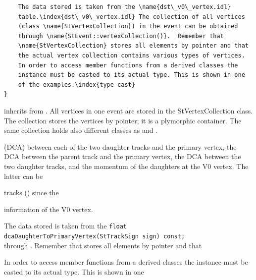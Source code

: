 \begin{enumerate}
\begin{Entry}
\begin{Entry}
{\begin{verbatim}
    The data stored is taken from the \name{dst\_v0\_vertex.idl}
    table.\index{dst\_v0\_vertex.idl} The collection of all vertices
    (class \name{StVertexCollection}) in the event can be obtained
    through \name{StEvent::vertexCollection()}.  Remember that
    \name{StVertexCollection} stores all elements by pointer and that
    the actual vertex collection contains various types of vertices.
    In order to access member functions from a derived classes the
    instance must be casted to its actual type. This is shown in one
    of the examples.\index{type cast}
}
\end{verbatim}
}%
%
     inherits from  .
    All vertices in one event are stored
    in the StVertexCollection class. The collection stores the
    vertices by pointer; it is a plymorphic container.
    The same collection holds also different classes as  and .
   
    (DCA) between each of the two daughter tracks and the
    primary vertex, the DCA between the parent track and the primary vertex,
    the DCA between the two daughter tracks, and the
    momentum of the daughters at the V0 vertex. The latter can be
    
    tracks () since the
    
    information of the V0 vertex.

    The data stored is taken from the 
    \verb+float dcaDaughterToPrimaryVertex(StTrackSign sign) const;+\\
    through .  Remember that
     stores all elements by pointer and that
    
    In order to access member functions from a derived classes the
    instance must be casted to its actual type. This is shown in one
    

\end{Entry}
\end{Entry}
\end{enumerate}
